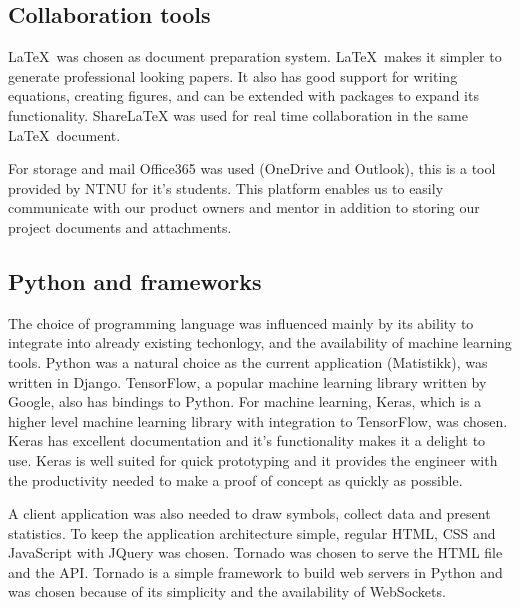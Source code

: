 \subsection{Collaboration tools}
\LaTeX \ was chosen as document preparation system. \LaTeX \ makes it simpler to generate professional looking papers. It also has good support for writing equations, creating figures, and can be extended with packages to expand its functionality. ShareLaTeX was used for real time collaboration in the same \LaTeX \ document. 

For storage and mail Office365 was used (OneDrive and Outlook), this is a tool provided by NTNU for it's students. This platform enables us to easily communicate with our product owners and mentor in addition to storing our project documents and attachments.


\subsection{Python and frameworks}
The choice of programming language was influenced mainly by its ability to integrate into already existing techonlogy, and the availability of machine learning tools. Python was a natural choice as the current application (Matistikk), was written in Django. TensorFlow, a popular machine learning library written by Google, also has bindings to Python. For machine learning, Keras\cite{chollet_keras_2015}, which is a higher level machine learning library with integration to TensorFlow, was chosen. Keras has excellent documentation and it's functionality makes it a delight to use. Keras is well suited for quick prototyping and it provides the engineer with the productivity needed to make a proof of concept as quickly as possible.


A client application was also needed to draw symbols, collect data and present statistics. To keep the application architecture simple, regular HTML, CSS and JavaScript with JQuery was chosen. Tornado was chosen to serve the HTML file and the API. Tornado is a simple framework to build web servers in Python and  was chosen because of its simplicity and the availability of WebSockets.

